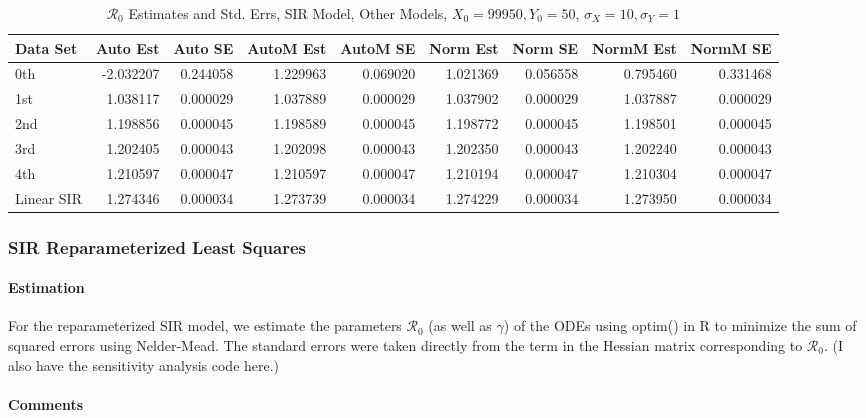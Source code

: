 \documentclass[12pt]{article}
\newcommand{\rr}{\ensuremath{\mathcal{R}_0}}
\begin{document}
\begin{table}[H]
	
	\caption{$\rr$ Estimates and Std. Errs, SIR Model,
		Other Models, $X_0 = 99950, Y_0 = 50$, 
		$\sigma_X = 10, \sigma_Y = 1$}
	\begin{footnotesize}
		\hskip -1cm
		\begin{tabular}{l|r|r|r|r|r|r|r|r}
			\hline
			Data Set & Auto Est & Auto SE & AutoM Est & AutoM SE & Norm Est & Norm SE & NormM Est & NormM SE\\
			\hline
			0th & -2.032207 & 0.244058 & 1.229963 & 0.069020 & 1.021369 & 0.056558 & 0.795460 & 0.331468\\
			\hline
			1st & 1.038117 & 0.000029 & 1.037889 & 0.000029 & 1.037902 & 0.000029 & 1.037887 & 0.000029\\
			\hline
			2nd & 1.198856 & 0.000045 & 1.198589 & 0.000045 & 1.198772 & 0.000045 & 1.198501 & 0.000045\\
			\hline
			3rd & 1.202405 & 0.000043 & 1.202098 & 0.000043 & 1.202350 & 0.000043 & 1.202240 & 0.000043\\
			\hline
			4th & 1.210597 & 0.000047 & 1.210597 & 0.000047 & 1.210194 & 0.000047 & 1.210304 & 0.000047\\
			\hline
			Linear SIR & 1.274346 & 0.000034 & 1.273739 & 0.000034 & 1.274229 & 0.000034 & 1.273950 & 0.000034\\
			\hline
		\end{tabular}
	\end{footnotesize}
\end{table}

\subsubsection{SIR Reparameterized Least Squares}

\paragraph{Estimation}

For the reparameterized SIR model, we estimate the parameters $\rr$ (as well as $\gamma$) of the ODEs using optim() in R to minimize the sum of squared errors using Nelder-Mead. The standard errors were taken directly from the term in the Hessian matrix corresponding to $\rr$. (I also have the sensitivity analysis code here.)

\paragraph{Comments}
\end{document}
